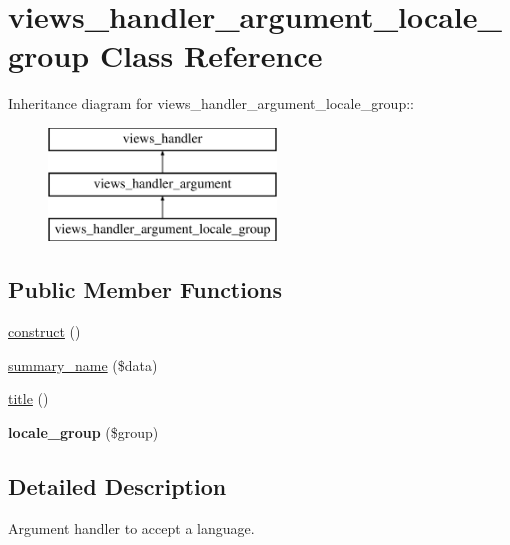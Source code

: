 \hypertarget{classviews__handler__argument__locale__group}{
\section{views\_\-handler\_\-argument\_\-locale\_\-group Class Reference}
\label{classviews__handler__argument__locale__group}
}
Inheritance diagram for views\_\-handler\_\-argument\_\-locale\_\-group::\begin{figure}[H]
\begin{center}
\leavevmode
\includegraphics[height=3cm]{classviews__handler__argument__locale__group}
\end{center}
\end{figure}
\subsection*{Public Member Functions}
\begin{DoxyCompactItemize}
\item 
\hyperlink{classviews__handler__argument__locale__group_a5dd96da33f67166727c6af6547ccbb7a}{construct} ()
\item 
\hyperlink{classviews__handler__argument__locale__group_aeffcc011f90a9269f7793e089b994f71}{summary\_\-name} (\$data)
\item 
\hyperlink{classviews__handler__argument__locale__group_a5eb8e22e84904fa604f785484befe86a}{title} ()
\item 
\hypertarget{classviews__handler__argument__locale__group_a11e6dc97e511dffc715eff8ec1fb784a}{
{\bfseries locale\_\-group} (\$group)}
\label{classviews__handler__argument__locale__group_a11e6dc97e511dffc715eff8ec1fb784a}

\end{DoxyCompactItemize}


\subsection{Detailed Description}
Argument handler to accept a language. 


